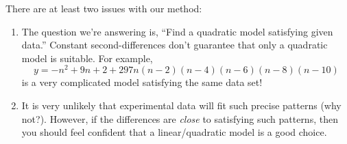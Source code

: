 
There are at least two issues with our method:
\begin{enumerate}
  \item The question we're answering is, ``Find a quadratic model satisfying given data.'' Constant second-differences don't guarantee that only a quadratic model is suitable. For example,
  \[
  	y=-n^2+9n+2 +297n(n-2)(n-4)(n-6)(n-8)(n-10)
  \]
  is a very complicated model satisfying the same data set!

  \item It is very unlikely that experimental data will fit such precise patterns (why not?). However, if the differences are \emph{close} to satisfying such patterns, then you should feel confident that a linear/quadratic model is a good choice.
\end{enumerate}
\goodbreak


